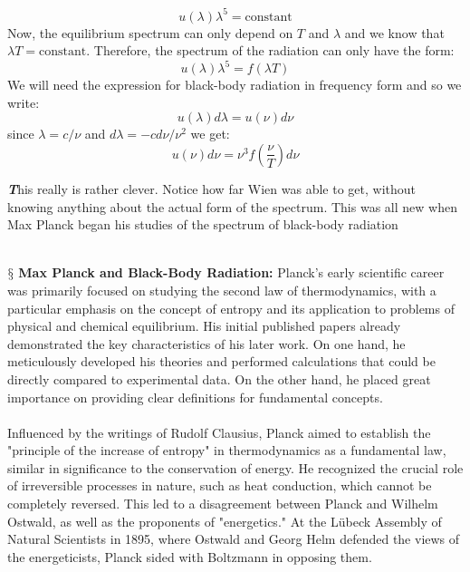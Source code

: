 \documentclass[9pt,a4paper, twocolumn]{article}
\newcounter{theo}
\newenvironment{callout}
	{\begin{calloutbox}\color{charcoal}\textbf\textit}
	{\end{calloutbox}}
\newcommand{\newpoint}[1]{\ \\ \indent$\mathsection$ \textbf{#1}}
\begin{document}
            \begin{equation}
                u(\lambda)\lambda^5 = \text{constant}
            \end{equation}
            Now, the equilibrium spectrum can only depend on $T$ and $\lambda$ and we know that $\lambda T = \text{constant}$. Therefore, the spectrum of the radiation can only have the form:
            \begin{equation}
                u(\lambda)\lambda^5 = f(\lambda T)
            \end{equation}
            We will need the expression for black-body radiation in frequency form and so we write:
            \begin{equation}
                u(\lambda)d\lambda = u(\nu)d\nu
            \end{equation}
            since $\lambda = c/\nu$ and $d\lambda = -cd\nu/\nu^2$ we get:
            \begin{equation}
                \boxed{u(\nu)d\nu = \nu^3 f(\frac{\nu}{T})d\nu}
            \end{equation}
            \begin{callout}
                This really is rather clever. Notice how far Wien was able to get, without knowing anything about the actual form of the spectrum. This was all new when Max Planck began his studies of the spectrum of black-body radiation
            \end{callout}
            \newpoint{Max Planck and Black-Body Radiation:} Planck's early scientific career was primarily focused on studying the second law of thermodynamics, with a particular emphasis on the concept of entropy and its application to problems of physical and chemical equilibrium. His initial published papers already demonstrated the key characteristics of his later work. On one hand, he meticulously developed his theories and performed calculations that could be directly compared to experimental data. On the other hand, he placed great importance on providing clear definitions for fundamental concepts.
            \\
            \\
            Influenced by the writings of Rudolf Clausius, Planck aimed to establish the "principle of the increase of entropy" in thermodynamics as a fundamental law, similar in significance to the conservation of energy. He recognized the crucial role of irreversible processes in nature, such as heat conduction, which cannot be completely reversed. This led to a disagreement between Planck and Wilhelm Ostwald, as well as the proponents of "energetics." At the Lübeck Assembly of Natural Scientists in 1895, where Ostwald and Georg Helm defended the views of the energeticists, Planck sided with Boltzmann in opposing them.
\end{document}
